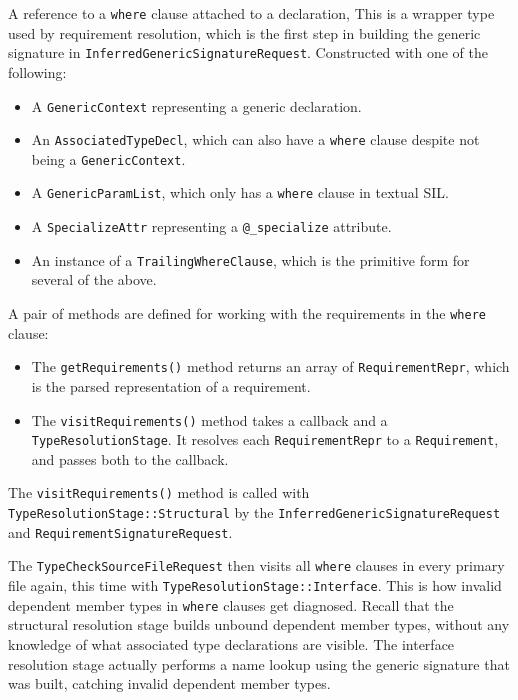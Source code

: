 \documentclass[../generics]{subfiles}
\begin{document}
A reference to a \texttt{where} clause attached to a declaration, This is a wrapper type used by requirement resolution, which is the first step in building the generic signature in \texttt{InferredGenericSignatureRequest}. Constructed with one of the following:
\begin{itemize}
\item A \texttt{GenericContext} representing a generic declaration.
\item An \texttt{AssociatedTypeDecl}, which can also have a \texttt{where} clause despite not being a \texttt{GenericContext}.
\item A \texttt{GenericParamList}, which only has a \texttt{where} clause in textual SIL.
\item A \texttt{SpecializeAttr} representing a \verb|@_specialize| attribute.
\item An instance of a \texttt{TrailingWhereClause}, which is the primitive form for several of the above.
\end{itemize}
A pair of methods are defined for working with the requirements in the \texttt{where} clause:
\begin{itemize}
\item The \texttt{getRequirements()} method returns an array of \texttt{RequirementRepr}, which is the parsed representation of a requirement.
\item The \texttt{visitRequirements()} method takes a callback and a \texttt{TypeResolutionStage}. It resolves each \texttt{RequirementRepr} to a \texttt{Requirement}, and passes both to the callback.
\end{itemize}
The \texttt{visitRequirements()} method is called with \texttt{TypeResolutionStage::Structural} by the \texttt{InferredGenericSignatureRequest} and \texttt{RequirementSignatureRequest}.

The \texttt{TypeCheckSourceFileRequest} then visits all \texttt{where} clauses in every primary file again, this time with \texttt{TypeResolutionStage::Interface}. This is how invalid dependent member types in \texttt{where} clauses get diagnosed. Recall that the structural resolution stage builds unbound dependent member types, without any knowledge of what associated type declarations are visible. The interface resolution stage actually performs a name lookup using the generic signature that was built, catching invalid dependent member types.
\end{document}
